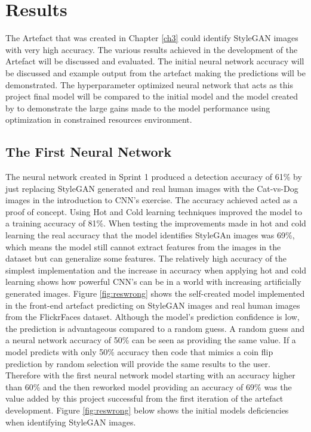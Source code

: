\chapter{Results}

The Artefact that was created in Chapter \ref{ch3} could identify StyleGAN images with very high accuracy. The various results achieved in the development of the Artefact will be discussed and evaluated. The initial neural network accuracy will be discussed and example output from the artefact making the predictions will be demonstrated. The hyperparameter optimized neural network that acts as this project final model will be compared to the initial model and the model created by \cite{Wang} to demonstrate the large gains made to the model performance using optimization in constrained resources environment. 

\section{The First Neural Network}

The neural network created in Sprint 1 produced a detection accuracy of 61\% by just replacing StyleGAN generated and real human images with the Cat-vs-Dog images in the introduction to CNN's exercise. The accuracy achieved acted as a proof of concept. Using Hot and Cold learning techniques improved the model to a training accuracy of 81\%. When testing the improvements made in hot and cold learning the real accuracy that the model identifies StyleGAn images was 69\%, which means the model still cannot extract features from the images in the dataset but can generalize some features. The relatively high accuracy of the simplest implementation and the increase in accuracy when applying hot and cold learning shows how powerful CNN's can be in a world with increasing artificially generated images. Figure \ref{fig:reswrong} shows the self-created model implemented in the front-end artefact predicting on StyleGAN images and real human images from the FlickrFaces dataset. Although the model's prediction confidence is low, the prediction is advantageous compared to a random guess. A random guess and a neural network accuracy of 50\% can be seen as providing the same value. If a model predicts with only 50\% accuracy then code that mimics a coin flip prediction by random selection will provide the same results to the user. Therefore with the first neural network model starting with an accuracy higher than 60\% and the then reworked model providing an accuracy of 69\% was the value added by this project successful from the first iteration of the artefact development. Figure \ref{fig:reswrong} below shows the initial models deficiencies when identifying StyleGAN images.

